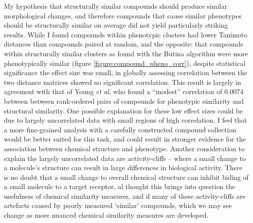 \documentclass[a4paper,11pt,twoside,openright]{scrbook}
\begin{document}
My hypothesis that structurally similar compounds should produce similar morphological changes, and therefore compounds 
that cause similar phenotypes should be structurally similar on average did not yield particularly striking results.
While I found compounds within phenotypic clusters had lower Tanimoto distances than compounds paired at random, and 
the opposite: that compounds within structurally similar clusters as found with the Butina algorithm were more 
phenotypically similar (figure \ref{figure:compound_pheno_corr}), despite statistical significance the effect size was 
small, in globally assessing correlation between the two distance matrices showed no significant correlation.
This result is largely in agreement with that of Young \textit{et al.} who found a ``modest'' correlation of 0.0074 
between between rank-ordered pairs of compounds for phenotypic similarity and structural similarity. \cite{Young2008}
One possible explanation for these low effect sizes could be due to largely uncorrelated data with small regions of 
high correlation.
I feel that a more fine-grained analysis with a carefully constructed compound collection would be better suited for 
this task, and could result in stronger evidence for the association between chemical structure and phenotype.
Another consideration to explain the largely uncorrelated data are activity-cliffs -- where a small change to a 
molecule's structure can result in large differences in biological activity.
There is no doubt that a small change to overall chemical structure can inhibit biding of a small molecule to a target 
receptor, al thought this brings into question the usefulness of chemical similarity measures, and if many of these 
activity-cliffs are artefacts caused by poorly measured `similar' compounds, which we may see change as more nuanced 
chemical similarity measures are developed.
\end{document}
